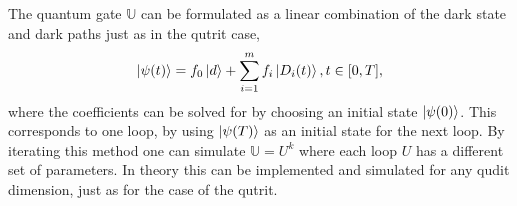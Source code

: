 The quantum gate $\mathbb{U}$ can be formulated as a linear combination of the dark state and dark paths just as in the qutrit case,
\begin{equation}
\ket{\psi(t)} = f_0\ket{d} + \sum_{i = 1}^{m}f_i\ket{D_i(t)}, t \in [0,T],
\end{equation}
where the coefficients can be solved for by choosing an initial state $\ket{\psi(0)}$. This corresponds to one loop, by using $\ket{\psi(T)}$ as an initial state for the next loop. By iterating this method one can simulate $\mathbb{U} = U^k$ where each loop $U$ has a different set of parameters. In theory this can be implemented and simulated for any qudit dimension, just as for the case of the qutrit. 






